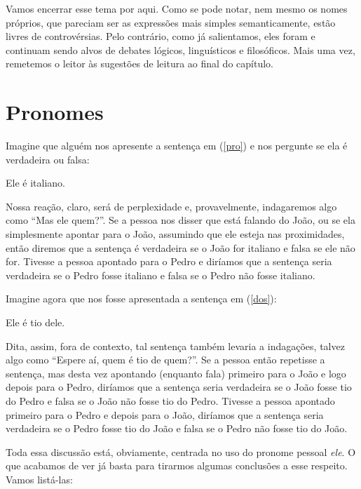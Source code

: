 Vamos encerrar esse tema por aqui. Como se pode notar, nem mesmo os nomes próprios, que pareciam ser as expressões mais simples semanticamente, estão livres de controvérsias. Pelo contrário, como já salientamos, eles foram e continuam sendo alvos de debates lógicos, linguísticos e filosóficos. Mais uma vez, remetemos o leitor às sugestões de leitura ao final do capítulo.



\section{Pronomes}

Imagine que alguém nos apresente a sentença em (\ref{pro}) e nos
pergunte se ela é verdadeira ou falsa:

\begin{exe}
\ex Ele é italiano.\label{pro}
\end{exe}

\n Nossa reação, claro, será de perplexidade e, provavelmente, indagaremos algo como ``Mas ele quem?''. Se a pessoa nos disser
que está falando do João, ou se ela simplesmente apontar para
o João, assumindo que ele esteja nas proximidades, então diremos
que a sentença é verdadeira se o João for italiano e falsa se ele
não for. Tivesse a pessoa apontado para o Pedro e diríamos que a
sentença seria verdadeira se o Pedro fosse italiano e falsa se o
Pedro não fosse italiano.

Imagine agora que nos fosse apresentada a sentença em (\ref{dos}):

\begin{exe}
\ex Ele é tio dele.\label{dos}
\end{exe}

Dita, assim, fora de contexto, tal sentença também levaria a
indagações, talvez algo como ``Espere aí, quem é tio de quem?''.
Se a pessoa então repetisse a sentença, mas desta vez apontando
(enquanto fala) primeiro para o João e logo depois para o Pedro,
diríamos que a sentença seria verdadeira se o João fosse tio do
Pedro e falsa se o João não fosse tio do Pedro. Tivesse a pessoa
apontado primeiro para o Pedro e depois para o João, diríamos que
a sentença seria verdadeira se o Pedro fosse tio do João e falsa
se o Pedro não fosse tio do João.

Toda essa discussão está, obviamente, centrada  no uso do pronome
pessoal \textit{ele}. O que acabamos de ver já basta para tirarmos
algumas conclusões a esse respeito. Vamos listá-las:

